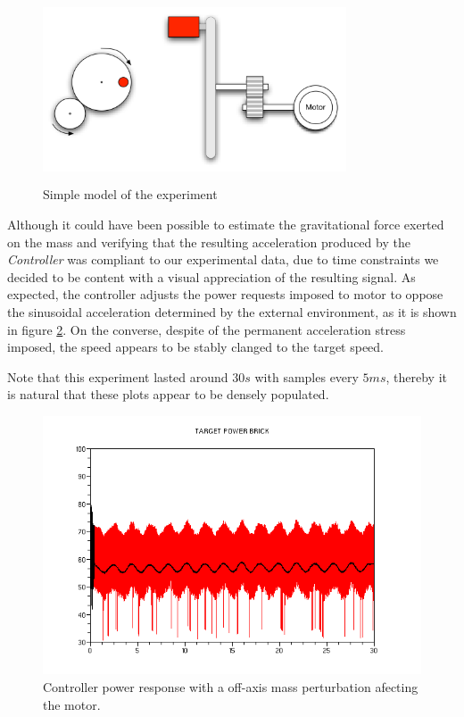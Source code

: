 \begin{figure}[htbp]
  \begin{center}
  \includegraphics[height=55mm,width=90mm]{FIGURES_2/MotorsModel.png}
    \caption[]{Simple model of the experiment}
    \label{fig:MotorsModel}
  \end{center}
\end{figure}

Although it could have been possible to estimate the gravitational force exerted on the mass and verifying that the resulting acceleration produced by the \emph{Controller} was compliant to our experimental data, due to time constraints we decided to be content with a visual appreciation of the resulting signal. As expected, the controller adjusts the power requests imposed to motor to oppose the sinusoidal acceleration determined by the external environment, as it is shown in figure \ref{fig:weightTargetPower}.  On the converse, despite of the permanent acceleration stress imposed, the speed appears to be stably clanged to the target speed.

Note that this experiment lasted around $30 s$ with samples every $5 ms$, thereby it is natural that these plots appear to be densely populated.

\begin{figure}[H]
  \begin{center}
  \includegraphics[scale=0.5]{FIGURES_2/BRK-Weight-PR.png}
    \caption[]{Controller power response with a off-axis mass perturbation afecting the motor.}
    \label{fig:weightTargetPower}
  \end{center}
\end{figure}

